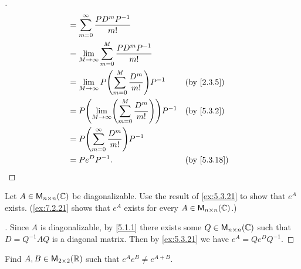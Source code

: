 \begin{proof}[]
\begin{align*}
		    & = \sum_{m = 0}^\infty \frac{P D^m P^{-1}}{m!}                                           \\
		    & = \lim_{M \to \infty} \sum_{m = 0}^M \frac{P D^m P^{-1}}{m!}                            \\
		    & = \lim_{M \to \infty} P \pa{\sum_{m = 0}^M \frac{D^m}{m!}} P^{-1}      &  & \by{2.3.5}  \\
		    & = P \pa{\lim_{M \to \infty} \pa{\sum_{m = 0}^M \frac{D^m}{m!}}} P^{-1} &  & \by{5.3.2}  \\
		    & = P \pa{\sum_{m = 0}^\infty \frac{D^m}{m!}} P^{-1}                                      \\
		    & = P e^D P^{-1}.                                                        &  & \by{5.3.18}
	\end{align*}
\end{proof}

\begin{ex}\label{ex:5.3.22}
	Let \(A \in \mathsf{M}_{{n} \times n}({\mathbb{C}})\) be diagonalizable.
	Use the result of \cref{ex:5.3.21} to show that \(e^A\) exists.
	(\cref{ex:7.2.21} shows that \(e^A\) exists for every \(A \in \mathsf{M}_{{n} \times n}({\mathbb{C}})\).)
\end{ex}

\begin{proof}[]
	Since \(A\) is diagonalizable, by \cref{5.1.1} there exists some \(Q \in \mathsf{M}_{{n} \times n}({\mathbb{C}})\) such that \(D = Q^{-1} A Q\) is a diagonal matrix.
	Then by \cref{ex:5.3.21} we have \(e^A = Q e^D Q^{-1}\).
\end{proof}

\begin{ex}\label{ex:5.3.23}
	Find \(A, B \in \mathsf{M}_{{2} \times 2}({\mathbb{R}})\) such that \(e^A e^B \neq e^{A + B}\).
\end{ex}

